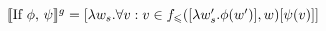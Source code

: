 $\llbracket\text{If $\phi$, $\psi$}\rrbracket^{g}=[\lambda w_s.\forall v:v\in f_\leqslant([\lambda w'_s.\phi(w')],w)[\psi(v)]]$